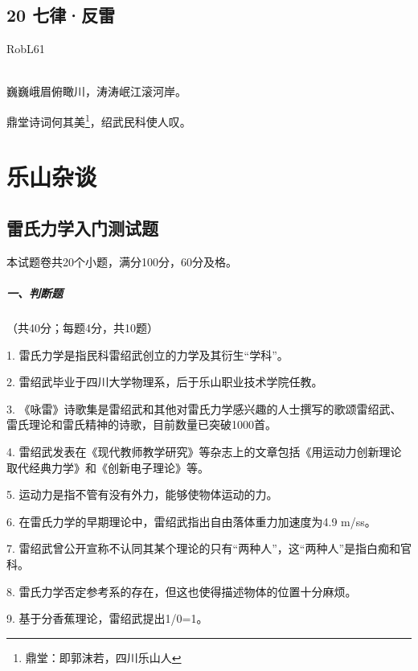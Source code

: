 \documentclass[UTF8,12pt,oneside]{ctexbook}
\begin{document}
        
    \section{20 七律·反雷}
    \begin{center}
        RobL61
        
        ~\\
        巍巍峨眉俯瞰川，涛涛岷江滚河岸。
        
        鼎堂诗词何其美\footnote{鼎堂：即郭沫若，四川乐山人}，绍武民科使人叹。
        
    \end{center}
    
    
    \chapter{乐山杂谈}
        \section{雷氏力学入门测试题}
        
        本试题卷共20个小题，满分100分，60分及格。

        \paragraph{一、判断题}（共40分；每题4分，共10题）
        
        1. 雷氏力学是指民科雷绍武创立的力学及其衍生“学科”。
        	
        2. 雷绍武毕业于四川大学物理系，后于乐山职业技术学院任教。
        	
        3. 《咏雷》诗歌集是雷绍武和其他对雷氏力学感兴趣的人士撰写的歌颂雷绍武、雷氏理论和雷氏精神的诗歌，目前数量已突破1000首。
        	
        4. 雷绍武发表在《现代教师教学研究》等杂志上的文章包括《用运动力创新理论取代经典力学》和《创新电子理论》等。
        	
        5. 运动力是指不管有没有外力，能够使物体运动的力。
        	
        6. 在雷氏力学的早期理论中，雷绍武指出自由落体重力加速度为4.9 m/ss。
        	
        7. 雷绍武曾公开宣称不认同其某个理论的只有“两种人”，这“两种人”是指白痴和官科。
        
        8. 雷氏力学否定参考系的存在，但这也使得描述物体的位置十分麻烦。
        
        9. 基于分香蕉理论，雷绍武提出1/0=1。
        
\end{document}
